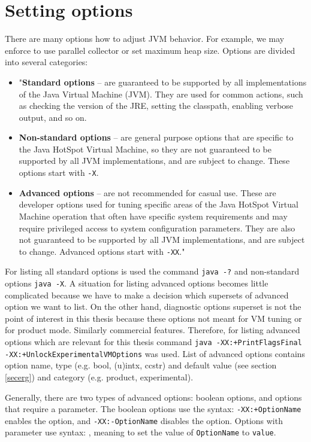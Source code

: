 \documentclass[
  digital, %
  oneside,
  notable, %
  nolof,     %
  nolot     %
]{fithesis3}
\begin{document}
\section{Setting options}\label{secoptions}
There are many options how to adjust JVM behavior. For example, we may enforce to use parallel collector or set maximum heap size. Options are divided into several categories:
\begin{itemize}
	\item "\textbf{Standard options} -- are guaranteed to be supported by all implementations of the Java Virtual Machine (JVM). They are used for common actions, such as checking the version of the JRE, setting the classpath, enabling verbose output, and so on.
	\item \textbf{Non-standard options} -- are general purpose options that are specific to the Java HotSpot Virtual Machine, so they are not guaranteed to be supported by all JVM implementations, and are subject to change. These options start with \texttt{-X}.
	\item \textbf{Advanced options} -- are not recommended for casual use. These are developer options used for tuning specific areas of the Java HotSpot Virtual Machine operation that often have specific system requirements and may require privileged access to system configuration parameters. They are also not guaranteed to be supported by all JVM implementations, and are subject to change. Advanced options start with \texttt{-XX}." \cite{java}
\end{itemize}
For listing all standard options is used the command \texttt{java -?} and non-standard options \texttt{java -X}. A situation for listing advanced options becomes little complicated because we have to make a decision which supersets of advanced option we want to list. On the other hand, diagnostic options superset is not the point of interest in this thesis because these options not meant for VM tuning or for product mode. Similarly commercial features. Therefore, for listing advanced options which are relevant for this thesis command \texttt{java -XX:+PrintFlagsFinal -XX:+UnlockExperimentalVMOptions} was used. List of advanced options contains option name, type (e.g. bool, (u)intx, ccstr) and default value (see section \ref{secerg}) and category (e.g. product, experimental).

Generally, there are two types of advanced options: boolean options, and options that require a parameter. The boolean options use the syntax: \texttt{-XX:+OptionName} enables the option, and \texttt{-XX:-OptionName} disables the option. Options with parameter use syntax: \texttt{}, meaning to set the value of \texttt{OptionName} to \texttt{value}. \cite{scott}
\end{document}
